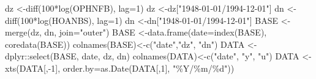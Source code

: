 \documentclass[
]{book}
\newenvironment{Shaded}{\begin{snugshade}}{\end{snugshade}}
\newcommand{\AttributeTok}[1]{\textcolor[rgb]{0.77,0.63,0.00}{#1}}
\newcommand{\DecValTok}[1]{\textcolor[rgb]{0.00,0.00,0.81}{#1}}
\newcommand{\FunctionTok}[1]{\textcolor[rgb]{0.00,0.00,0.00}{#1}}
\newcommand{\NormalTok}[1]{#1}
\newcommand{\OtherTok}[1]{\textcolor[rgb]{0.56,0.35,0.01}{#1}}
\newcommand{\SpecialCharTok}[1]{\textcolor[rgb]{0.00,0.00,0.00}{#1}}
\newcommand{\StringTok}[1]{\textcolor[rgb]{0.31,0.60,0.02}{#1}}
\begin{document}
\begin{Shaded}
\begin{Highlighting}[]
\NormalTok{dz         }\OtherTok{\textless{}{-}}\FunctionTok{diff}\NormalTok{(}\DecValTok{100}\SpecialCharTok{*}\FunctionTok{log}\NormalTok{(OPHNFB), }\AttributeTok{lag=}\DecValTok{1}\NormalTok{)}
\NormalTok{dz         }\OtherTok{\textless{}{-}}\NormalTok{dz[}\StringTok{"1948{-}01{-}01/1994{-}12{-}01"}\NormalTok{]  }
\NormalTok{dn         }\OtherTok{\textless{}{-}}\FunctionTok{diff}\NormalTok{(}\DecValTok{100}\SpecialCharTok{*}\FunctionTok{log}\NormalTok{(HOANBS), }\AttributeTok{lag=}\DecValTok{1}\NormalTok{)}
\NormalTok{dn         }\OtherTok{\textless{}{-}}\NormalTok{dn[}\StringTok{"1948{-}01{-}01/1994{-}12{-}01"}\NormalTok{]  }
\NormalTok{BASE       }\OtherTok{\textless{}{-}}\FunctionTok{merge}\NormalTok{(dz, dn, }\AttributeTok{join=}\StringTok{"outer"}\NormalTok{)}
\NormalTok{BASE       }\OtherTok{\textless{}{-}}\FunctionTok{data.frame}\NormalTok{(}\AttributeTok{date=}\FunctionTok{index}\NormalTok{(BASE), }\FunctionTok{coredata}\NormalTok{(BASE))}
\FunctionTok{colnames}\NormalTok{(BASE)}\OtherTok{\textless{}{-}}\FunctionTok{c}\NormalTok{(}\StringTok{"date"}\NormalTok{,}\StringTok{"dz"}\NormalTok{, }\StringTok{"dn"}\NormalTok{)}
\NormalTok{DATA    }\OtherTok{\textless{}{-}}\NormalTok{dplyr}\SpecialCharTok{::}\FunctionTok{select}\NormalTok{(BASE, date, dz, dn)}
\FunctionTok{colnames}\NormalTok{(DATA)}\OtherTok{\textless{}{-}}\FunctionTok{c}\NormalTok{(}\StringTok{"date"}\NormalTok{, }\StringTok{"y"}\NormalTok{, }\StringTok{"u"}\NormalTok{)}
\NormalTok{DATA    }\OtherTok{\textless{}{-}} \FunctionTok{xts}\NormalTok{(DATA[,}\SpecialCharTok{{-}}\DecValTok{1}\NormalTok{], }\AttributeTok{order.by=}\FunctionTok{as.Date}\NormalTok{(DATA[,}\DecValTok{1}\NormalTok{], }\StringTok{"\%Y/\%m/\%d"}\NormalTok{))}
\end{Highlighting}
\end{Shaded}
\end{document}
